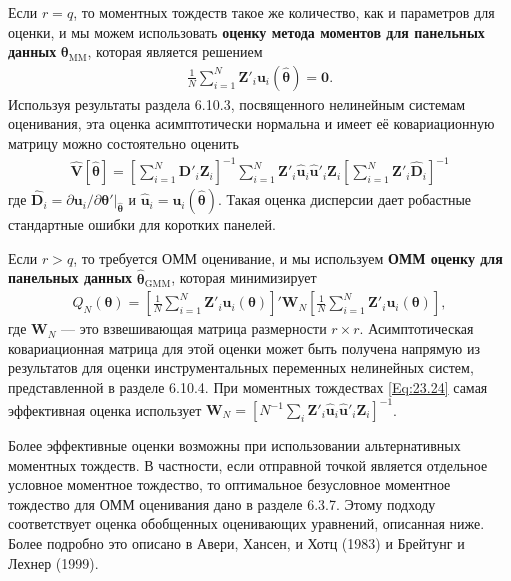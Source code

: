 Если $r=q$, то моментных тождеств такое же количество, как и параметров для оценки, и мы можем использовать \textbf{оценку метода моментов для панельных данных} $\mathbf{\theta}_{\mathrm{MM}}$, которая является решением 
\begin{align}
\frac{1}{N} \sum^N_{i=1} \mathbf{Z}'_i \mathbf{u}_i (\hat{\bm\theta})=\mathbf{0}.
\label{Eq:23.25}
\end{align}
Используя результаты раздела 6.10.3, посвященного нелинейным системам оценивания, эта оценка асимптотически нормальна и имеет её  ковариационную матрицу можно состоятельно оценить
\begin{align}
\hat{\mathbf{V}} [\hat{\bm\theta}]=\left[ \sum^N_{i=1} \hat{\mathbf{D}}'_i \mathbf{Z}_i \right]^{-1} \sum^N_{i=1} \mathbf{Z}'_i \mathbf{\hat{u}}_i \mathbf{\hat{u}}'_i \mathbf{Z}_i 
\left[ \sum^N_{i=1} \mathbf{Z}'_i \hat{\mathbf{D}}_i  \right]^{-1}
\label{Eq:23.26}
\end{align}
где $\mathbf{\hat{D}}_i=\partial \mathbf{u}_i/ \partial \bm\theta'|_{\hat{\bm\theta}}$ и $\mathbf{\hat{u}}_i=\mathbf{u}_i(\hat{\bm\theta})$. Такая оценка дисперсии дает робастные стандартные ошибки для коротких панелей.

Если $r > q$, то требуется ОММ оценивание, и мы используем \textbf{ОММ оценку для панельных данных} $\hat{\bm\theta}_{\mathrm{GMM}}$, которая минимизирует 
\begin{align}
Q_{N}(\bm\theta)=\left[ \frac{1}{N} \sum^N_{i=1} \mathbf{Z}'_i \mathbf{u}_i (\bm\theta) \right]' \mathbf{W}_N \left[ \frac{1}{N} \sum^N_{i=1} \mathbf{Z}'_i \mathbf{u}_i (\bm\theta) \right],
\label{Eq:23.27}
\end{align}
где $\mathbf{W}_N$ --- это взвешивающая матрица размерности $r \times r$. Асимптотическая ковариационная матрица для этой оценки может быть получена напрямую из результатов для  оценки инструментальных переменных нелинейных систем, представленной в разделе 6.10.4. При моментных тождествах \ref{Eq:23.24} самая эффективная оценка использует $\mathbf{W}_N=[N^{-1} \sum_i \mathbf{Z}'_i \mathbf{\hat{u}}_i 
\mathbf{\hat{u}}'_i \mathbf{Z}_i ]^{-1}$.

Более эффективные оценки возможны при использовании альтернативных моментных тождеств. В частности, если отправной точкой является отдельное условное моментное тождество, то оптимальное безусловное моментное тождество для ОММ оценивания дано в разделе 6.3.7. Этому подходу соответствует оценка обобщенных оценивающих уравнений, описанная ниже. Более подробно это описано в Авери, Хансен, и Хотц (1983) и Брейтунг и Лехнер (1999).


